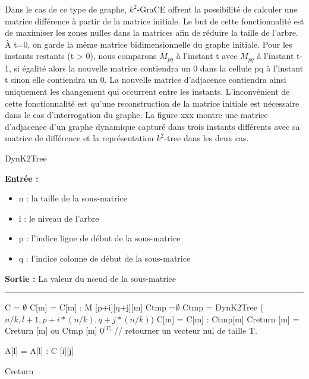 \documentclass[a4paper,oneside,12pt]{report}
\theoremstyle{definition}
\begin{document}
	
	Dans le cas de ce type de graphe, $k^2$-GraCE offrent la possibilité de calculer une matrice différence à partir de la matrice initiale. Le but de cette fonctionnalité est de maximiser les zones nulles dans la matrices afin de réduire la taille de l'arbre. À t=0, on garde la même matrice bidimensionnelle du graphe initiale. Pour les instants restants (t > 0), nous comparons $M_{pq}$ à l'instant t avec $M_{pq}$ à l'instant t-1, si égalité alors la nouvelle matrice contiendra un 0 dans la cellule pq à l'instant t sinon elle contiendra un 0. La nouvelle matrice d'adjacence contiendra ainsi uniquement les changement qui occurrent entre les instants. L'inconvénient de cette fonctionnalité est qu'une reconstruction de la matrice initiale est nécessaire dans le cas d'interrogation du graphe. La figure xxx montre une matrice d'adjacence d'un graphe dynamique capturé dans trois instants différents avec sa matrice de différence et la représentation $k^2$-tree dans les deux cas.
	
					\begin{algorithm}[H]
					\label{alg:dynk2_tree}
					\caption{DynK2Tree}
					\textbf{Entrée :}
						\begin{itemize}[label=$\bullet$]
							\item n : la taille de la sous-matrice
							\item l : le niveau de l'arbre
							\item p : l'indice ligne de début de la sous-matrice
							\item q : l'indice colonne de début de la sous-matrice
						\end{itemize}
					\textbf{Sortie :} La valeur du nœud de la sous-matrice\\							\noindent\rule{\textwidth}{1pt}
						
						
				\begin{algorithmic} [1]
					\STATE C = $ \emptyset$
									\STATE C[m] = C[m] : M [p+i][q+j][m]
								\ENDFOR
							\ELSE
								\STATE Ctmp =$\emptyset$
								\STATE  Ctmp = DynK2Tree ( $n/k,l+1,p+i*(n/k), q+j*(n/k)$)
									\STATE C[m] = C[m] : Ctmp[m]
									\STATE Creturn [m] = Creturn [m] ou Ctmp [m]
								\ENDFOR
							\ENDIF
						\ENDFOR
					\ENDFOR
						\RETURN $0^{|T|}$ // retourner un vecteur nul de taille T.
					\ENDIF
					
					
					
								\STATE A[l] = A[l] : C [i][j]
							\ENDIF
						\ENDFOR
					\ENDFOR
	
					 \RETURN Creturn
					
				\end{algorithmic}
			\end{algorithm}
			
\end{document}
